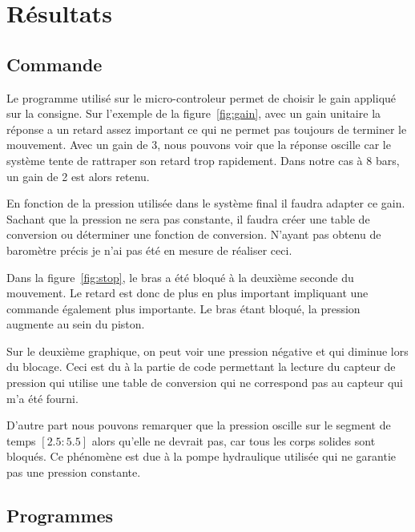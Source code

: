 \section{R\'esultats}
\label{sec:result}

\subsection{Commande}
Le programme utilisé sur le micro-controleur permet de choisir le gain appliqué sur la consigne.
 Sur l'exemple de la figure~\ref{fig:gain}, avec un gain unitaire la réponse a un retard assez important ce qui ne permet pas toujours de terminer le mouvement.
 Avec un gain de 3, nous pouvons voir que la réponse oscille car le système tente de rattraper son retard trop rapidement.
 Dans notre cas à 8 bars, un gain de 2 est alors retenu.
 
  
En fonction de la pression utilisée dans le système final il faudra adapter ce gain.
Sachant que la pression ne sera pas constante, il faudra créer une table de conversion ou déterminer une fonction de conversion.
N'ayant pas obtenu de baromètre précis je n'ai pas été en mesure de réaliser ceci.
\saut 
 
 
 Dans la figure~\ref{fig:stop}, le bras a été bloqué à la deuxième seconde du mouvement.
 Le retard est donc de plus en plus important impliquant une commande également plus importante.
 Le bras étant bloqué, la pression augmente au sein du piston.
 
 Sur le deuxième graphique, on peut voir une pression négative et qui diminue lors du blocage.
 Ceci est du à la partie de code permettant la lecture du capteur de pression qui utilise une table de conversion qui ne correspond pas au capteur qui m'a été fourni.
 
  
 D'autre part nous pouvons remarquer que la pression oscille sur le segment de temps $[2.5:5.5]$ alors qu'elle ne devrait pas, car tous les corps solides sont bloqués.
 Ce ph\'enom\`ene est due \`a la pompe hydraulique utilis\'ee qui ne garantie pas une pression constante.
 
\subsection{Programmes}
 
